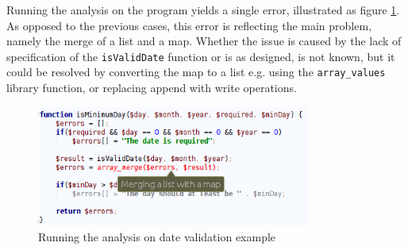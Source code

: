 Running the analysis on the program yields a single error, illustrated as figure \ref{fig:dateScreenshot}. As opposed to the previous cases, this error is reflecting the main problem, namely the merge of a list and a map. Whether the issue is caused by the lack of specification of the \texttt{isValidDate} function or is as designed, is not known, but it could be resolved by converting the map to a list e.g. using the \texttt{array\_values} library function, or replacing append with write operations.

\begin{figure}
\centering
\includegraphics[width=0.8\textwidth]{chapters/caseStudy/newScreens/validateDay}
\caption{Running the analysis on date validation example  }
\label{fig:dateScreenshot}
\end{figure}
